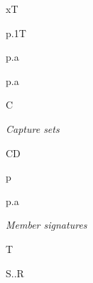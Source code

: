 \documentclass[acmsmall,screen,nonacm]{acmart}
\begin{document}
\begin{figure}[H]
\noindent
\begin{minipage}[t]{0.47\linewidth}
  {\Gamma\vdash x\Rightarrow T}

  {\Gamma\vdash p.1\Rightarrow T}
\end{minipage}\hfill
\begin{minipage}[t]{0.51\linewidth}
  {\Gamma\vdash p.a\Rightarrow{}}

  {\Gamma\vdash p.a\Rightarrow\mu}
\end{minipage}

 {\Gamma\vdash C\ \wf\qquad\Gamma\vdash\mu\ \wf}
\noindent
\begin{minipage}[t]{0.48\linewidth}
\noindent\textit{Capture sets}\par\nobreak
\begin{minipage}[t]{0.46\linewidth}

  {\Gamma\vdash C\cup D\ \wf}
\end{minipage}\hfill
\begin{minipage}[t]{0.51\linewidth}
  {\Gamma\vdash\set p\ \wf}

  {\Gamma\vdash p.a\ \wf}
\end{minipage}
\end{minipage}\hfill
\begin{minipage}[t]{0.50\linewidth}
\noindent\textit{Member signatures}\par\nobreak
\begin{minipage}[t]{0.31\linewidth}
  {\Gamma\vdash T\ \wf}
\end{minipage}\hfill
\begin{minipage}[t]{0.66\linewidth}
  {\Gamma\vdash S..R\ \wf}


\end{minipage}
\end{minipage}
\end{figure}
\end{document}
